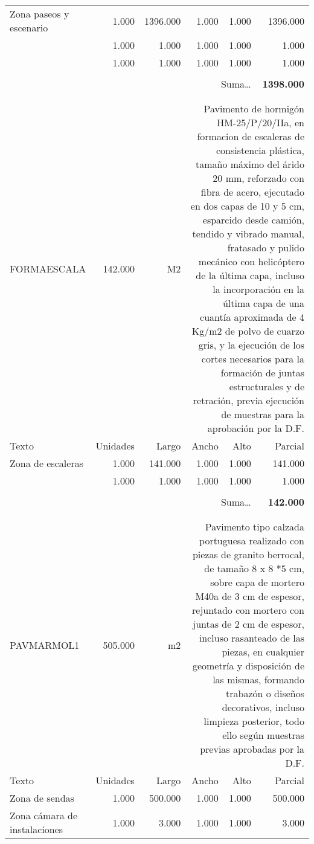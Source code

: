 \documentclass{book}%
\begin{document}
\begin{longtable}{lrrrrr}
\hline%
\multicolumn{1}{p{3.5cm}}{Zona paseos y escenario}&1.000&1396.000&1.000&1.000&1396.000\\%
\multicolumn{1}{p{3.5cm}}{}&1.000&1.000&1.000&1.000&1.000\\%
\multicolumn{1}{p{3.5cm}}{}&1.000&1.000&1.000&1.000&1.000\\%
&&&&&\\%
\multicolumn{5}{r}{Suma\ldots}&\textbf{1398.000}\\%
\hline%
&&&&&\\%
&&&&&\\%
FORMAESCALA&142.000& M2&\multicolumn{3}{p{6cm}}{\scriptsize Pavimento de hormigón HM-25/P/20/IIa,  en formacion de escaleras de consistencia plástica, tamaño máximo del árido 20 mm, reforzado con fibra de acero, ejecutado en dos capas de 10 y 5 cm, esparcido desde camión, tendido y vibrado manual, fratasado y pulido mecánico con helicóptero de la última capa, incluso la incorporación en la última capa de una cuantía aproximada de 4 Kg/m2 de polvo de cuarzo gris, y la ejecución de los cortes necesarios para la formación de juntas estructurales y de retración, previa ejecución de muestras para la aprobación por la D.F.\normalsize}\\%
Texto&Unidades&Largo&Ancho&Alto&Parcial\\%
\hline%
\multicolumn{1}{p{3.5cm}}{Zona de escaleras}&1.000&141.000&1.000&1.000&141.000\\%
\multicolumn{1}{p{3.5cm}}{}&1.000&1.000&1.000&1.000&1.000\\%
&&&&&\\%
\multicolumn{5}{r}{Suma\ldots}&\textbf{142.000}\\%
\hline%
&&&&&\\%
&&&&&\\%
PAVMARMOL1&505.000& m2&\multicolumn{3}{p{6cm}}{\scriptsize Pavimento tipo calzada portuguesa realizado con piezas de granito berrocal, de tamaño 8 x 8 *5 cm, sobre capa de mortero M40a de 3 cm de espesor, rejuntado con mortero con juntas de 2 cm de espesor, incluso rasanteado de las piezas, en cualquier geometría y disposición de las mismas, formando trabazón o diseños decorativos, incluso limpieza posterior, todo ello según muestras previas aprobadas por la D.F.\normalsize}\\%
Texto&Unidades&Largo&Ancho&Alto&Parcial\\%
\hline%
\multicolumn{1}{p{3.5cm}}{Zona de sendas}&1.000&500.000&1.000&1.000&500.000\\%
\multicolumn{1}{p{3.5cm}}{Zona cámara de instalaciones}&1.000&3.000&1.000&1.000&3.000\\%

\end{longtable}
\end{document}
